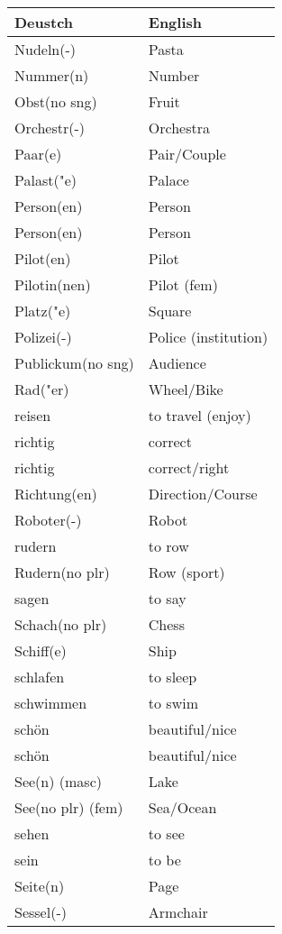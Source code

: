 \documentclass{article}
\renewcommand{\arraystretch}{1}
\begin{document}
\hfill
\begin{minipage}{0.48\textwidth}
    \centering
    \renewcommand{\arraystretch}{1.5}
    \begin{tabular}{|>{\raggedright\arraybackslash}p{3.5cm}|>{\raggedright\arraybackslash}p{3.5cm}|}
        \hline
        \rowcolor{gray!20} \textbf{Deustch} & \textbf{English} \\
        \hline
        Nudeln(-) & Pasta \\\hline
        Nummer(n) & Number \\\hline
        Obst(no sng) & Fruit \\\hline
        Orchestr(-) & Orchestra \\\hline
        Paar(e) & Pair/Couple \\\hline
        Palast("e) & Palace \\\hline
        Person(en) & Person \\\hline
        Person(en) & Person \\\hline
        Pilot(en) & Pilot \\\hline
        Pilotin(nen) & Pilot (fem) \\\hline
        Platz("e) & Square \\\hline
        Polizei(-) & Police (institution) \\\hline
        Publickum(no sng) & Audience \\\hline
        Rad("er) & Wheel/Bike \\\hline
        reisen & to travel (enjoy) \\\hline
        richtig & correct \\\hline
        richtig & correct/right \\\hline
        Richtung(en) & Direction/Course \\\hline
        Roboter(-) & Robot \\\hline
        rudern & to row \\\hline
        Rudern(no plr) & Row (sport) \\\hline
        sagen & to say \\\hline
        Schach(no plr) & Chess \\\hline
        Schiff(e) & Ship \\\hline
        schlafen & to sleep \\\hline
        schwimmen & to swim \\\hline
        schön & beautiful/nice \\\hline
        schön & beautiful/nice \\\hline
        See(n) (masc) & Lake \\\hline
        See(no plr) (fem) & Sea/Ocean \\\hline
        sehen & to see \\\hline
        sein & to be \\\hline
        Seite(n) & Page \\\hline
        Sessel(-) & Armchair \\\hline
    \end{tabular}
\end{minipage}
\end{document}
